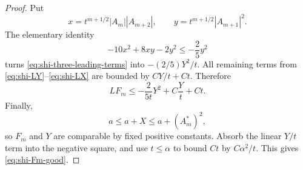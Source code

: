 \documentclass[10pt]{coll-l}
\theoremstyle{definition}
\theoremstyle{remark}
\numberwithin{section}{chapter}
\numberwithin{equation}{chapter}
\begin{document}
\begin{proof}
Put
\[
 x=t^{m+1/2}|A_m||A_{m+2}|,
 \qquad y=t^{m+1/2}|A_{m+1}|^2.
\]
The elementary identity
\begin{equation}
           -10x^2+8xy-2y^2
                \leq-\frac25y^2                         \label{eq:shi-quadratic-absorption}
\end{equation}
turns \eqref{eq:shi-three-leading-terms} into
$-(2/5)Y^2/t$.  All remaining terms from
\eqref{eq:shi-LY}--\eqref{eq:shi-LX} are bounded by
$CY/t+Ct$.  Therefore
\begin{equation}
             LF_m\leq-\frac{2}{5t}Y^2+C\frac Yt+Ct.      \label{eq:shi-LFm-Y}
\end{equation}
Finally,
\[
       a\leq a+X\leq a+(A_m^*)^2,
\]
so $F_m$ and $Y$ are comparable by fixed positive constants.  Absorb the
linear $Y/t$ term into the negative square, and use $t\leq\alpha$ to bound
$Ct$ by $C\alpha^2/t$.  This gives \eqref{eq:shi-Fm-good}.
\end{proof}
\end{document}

